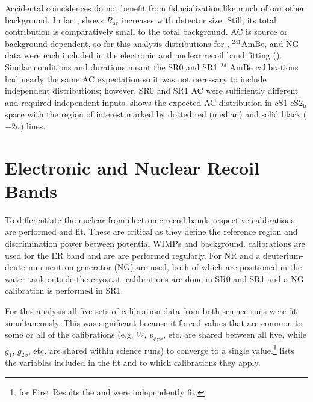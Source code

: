Accidental coincidences do not benefit from fiducialization like much of our other background.  In fact,
 shows $R_{\mathrm{ac}}$ increases
with detector size.  Still, its total contribution is comparatively small to the total background.  AC is source or background-dependent,
so for this analysis
distributions for , $\mathrm{^{241}AmBe}$, and NG data were each included in the electronic and nuclear recoil band fitting
().  Similar conditions and durations meant the SR0 and SR1 $^{241}$AmBe calibrations had nearly the same
AC expectation so it was not
necessary to include independent distributions; however, SR0 and SR1 AC  were sufficiently different and required independent
inputs.   shows the expected AC distribution in cS1-cS2$_{\mathrm{b}}$ space
with the region of interest marked by dotted red (median) and solid black ($-2 \sigma$) lines.




\section{Electronic and Nuclear Recoil Bands}
\label{sec:er_nr_calibrations}
To differentiate the nuclear from electronic recoil bands respective calibrations are performed and fit.  These are critical as
they define the reference region and discrimination power between potential WIMPs and background.   calibrations are used for
the ER band and are are performed regularly.  For NR  and a deuterium-deuterium
neutron generator (NG) are used, both of which are positioned in the water tank outside the cryostat.  \ambe calibrations are done in
SR0 and SR1 and a NG calibration is performed in SR1.

For this analysis all five sets of calibration data from both science runs were fit simultaneously.  This was
significant because it forced values that are common to some or all of the calibrations (e.g. $W$, $p_{\mathrm{dpe}}$, etc. are shared
between all five, while $g_1$, $g_{2\mathrm{b}}$, etc. are shared within science runs) to converge to a single
value.\footnote{for First Results
the \radoncal and \ambe were independently fit.}   lists the variables included in the fit and
to which calibrations they apply.



